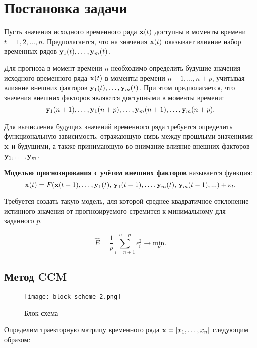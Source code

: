 \documentclass[a4paper, 12pt]{article}
\begin{document}
\section{Постановка задачи}
Пусть значения исходного временного ряда $\mathbf{x}(t)$ доступны в  моменты времени $t = 1, 2, \ldots, n$. Предполагается, что на значения $\mathbf{x}(t)$ оказывает влияние набор временных рядов $\mathbf{y}_1(t), \ldots, \mathbf{y}_m(t)$.

Для прогноза в момент времени $n$ необходимо определить будущие значения исходного временного ряда $\mathbf{x}(t)$ в моменты времени $n+1, \ldots, n+p$, учитывая влияние внешних факторов $\mathbf{y}_1(t), \ldots, \mathbf{y}_m(t)$. При этом предполагается, что значения внешних факторов являются доступными в моменты времени: \[\mathbf{y}_1(n+1), \ldots, \mathbf{y}_1(n+p), \ldots, \mathbf{y}_m(n+1), \ldots, \mathbf{y}_m(n+p).\]

Для вычисления будущих значений временного ряда требуется определить функциональную зависимость, отражающую связь между прошлыми значениями $\mathbf{x}$ и будущими, а также принимающую во внимание влияние внешних факторов $\mathbf{y}_1, \ldots, \mathbf{y}_m$.

\begin{definition}
	\textbf{Моделью прогнозирования с учётом внешних факторов} называется функция:
	\begin{equation*}
		\mathbf{x}(t) = F(\mathbf{x}(t-1), \ldots, \mathbf{y}_1(t), \, \mathbf{y}_1(t-1), \ldots, \mathbf{y}_m(t), \, \mathbf{y}_m(t-1), ...) + \varepsilon_t.
	\end{equation*}
\end{definition}

Требуется создать такую модель, для которой среднее квадратичное отклонение истинного значения от прогнозируемого стремится к минимальному для заданного $p$. 

\begin{equation*}
	\widehat{E} = \dfrac{1}{p} \sum\limits_{i=n+1}^{n+p} \epsilon_i^2 \rightarrow \underset{F}{\text{min}}.
\end{equation*}

\subsection{Метод CCM}
\begin{figure}[bhtp]
	\texttt{[image: block\_scheme\_2.png]}
	\caption{Блок-схема}
	\label{fig:schema}
\end{figure}

Определим траекторную матрицу временного ряда $\mathbf{x} = [x_1, \ldots, x_n]$ следующим образом: 
\end{document}
